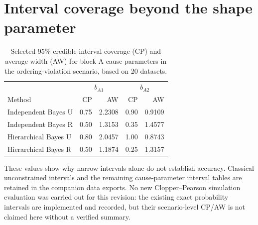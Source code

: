 \documentclass[a4paper,11pt]{article}
\begin{document}
\section{Interval coverage beyond the shape parameter}\label{app:interval}
\begin{table}[htbp]\centering\small
\caption{Selected 95\% credible-interval coverage (CP) and average width (AW) for block A cause parameters in the ordering-violation scenario, based on 20 datasets.}\label{tab:cause-interval-aw}
\begin{tabular}{lrrrr}\toprule
 & \multicolumn{2}{c}{$b_{A1}$} & \multicolumn{2}{c}{$b_{A2}$}\\
Method & CP & AW & CP & AW\\\midrule
Independent Bayes U & 0.75 & 2.2308 & 0.90 & 0.9109\\
Independent Bayes R & 0.50 & 1.3153 & 0.35 & 1.4577\\
Hierarchical Bayes U & 0.80 & 2.0457 & 1.00 & 0.8743\\
Hierarchical Bayes R & 0.50 & 1.1874 & 0.25 & 1.3157\\\bottomrule
\end{tabular}
\end{table}
These values show why narrow intervals alone do not establish accuracy. Classical unconstrained intervals and the remaining cause-parameter interval tables are retained in the companion data exports. No new Clopper--Pearson simulation evaluation was carried out for this revision: the existing exact probability intervals are implemented and recorded, but their scenario-level CP/AW is not claimed here without a verified summary.
\end{document}
